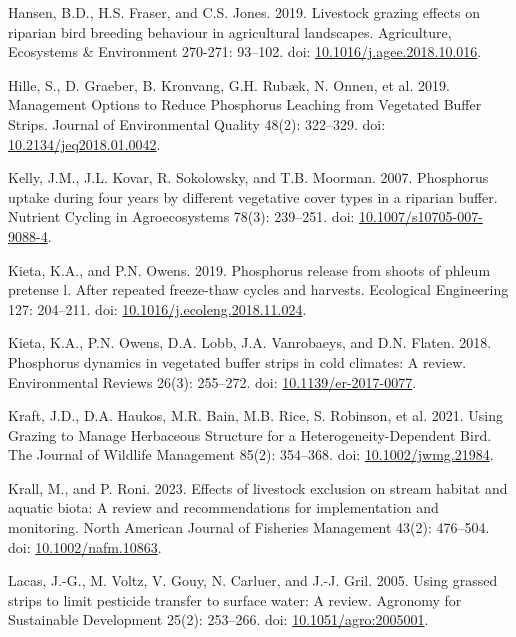 \documentclass[
]{agujournal2019}
\newlength{\cslhangindent}
\newenvironment{CSLReferences}[2] %
 {\begin{list}{}{%
  \setlength{\itemindent}{0pt}
  \setlength{\leftmargin}{0pt}
  \setlength{\parsep}{0pt}
  \ifodd #1
   \setlength{\leftmargin}{\cslhangindent}
   \setlength{\itemindent}{-1\cslhangindent}
  \fi
  \setlength{\itemsep}{#2\baselineskip}}}
 {\end{list}}
\begin{document}
\begin{CSLReferences}{1}{1}
Hansen, B.D., H.S. Fraser, and C.S. Jones. 2019. Livestock grazing
effects on riparian bird breeding behaviour in agricultural landscapes.
Agriculture, Ecosystems \& Environment 270-271: 93--102. doi:
\href{https://doi.org/10.1016/j.agee.2018.10.016}{10.1016/j.agee.2018.10.016}.

Hille, S., D. Graeber, B. Kronvang, G.H. Rubæk, N. Onnen, et al. 2019.
Management Options to Reduce Phosphorus Leaching from Vegetated Buffer
Strips. Journal of Environmental Quality 48(2): 322--329. doi:
\href{https://doi.org/10.2134/jeq2018.01.0042}{10.2134/jeq2018.01.0042}.

Kelly, J.M., J.L. Kovar, R. Sokolowsky, and T.B. Moorman. 2007.
Phosphorus uptake during four years by different vegetative cover types
in a riparian buffer. Nutrient Cycling in Agroecosystems 78(3):
239--251. doi:
\href{https://doi.org/10.1007/s10705-007-9088-4}{10.1007/s10705-007-9088-4}.

Kieta, K.A., and P.N. Owens. 2019. Phosphorus release from shoots of
phleum pretense l. After repeated freeze-thaw cycles and harvests.
Ecological Engineering 127: 204--211. doi:
\href{https://doi.org/10.1016/j.ecoleng.2018.11.024}{10.1016/j.ecoleng.2018.11.024}.

Kieta, K.A., P.N. Owens, D.A. Lobb, J.A. Vanrobaeys, and D.N. Flaten.
2018. Phosphorus dynamics in vegetated buffer strips in cold climates: A
review. Environmental Reviews 26(3): 255--272. doi:
\href{https://doi.org/10.1139/er-2017-0077}{10.1139/er-2017-0077}.

Kraft, J.D., D.A. Haukos, M.R. Bain, M.B. Rice, S. Robinson, et al.
2021. Using Grazing to Manage Herbaceous Structure for a
Heterogeneity-Dependent Bird. The Journal of Wildlife Management 85(2):
354--368. doi:
\href{https://doi.org/10.1002/jwmg.21984}{10.1002/jwmg.21984}.

Krall, M., and P. Roni. 2023. Effects of livestock exclusion on stream
habitat and aquatic biota: A review and recommendations for
implementation and monitoring. North American Journal of Fisheries
Management 43(2): 476--504. doi:
\href{https://doi.org/10.1002/nafm.10863}{10.1002/nafm.10863}.

Lacas, J.-G., M. Voltz, V. Gouy, N. Carluer, and J.-J. Gril. 2005. Using
grassed strips to limit pesticide transfer to surface water: A review.
Agronomy for Sustainable Development 25(2): 253--266. doi:
\href{https://doi.org/10.1051/agro:2005001}{10.1051/agro:2005001}.


\end{CSLReferences}
\end{document}

